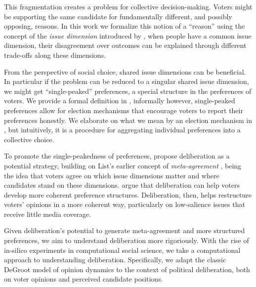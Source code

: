This fragmentation creates a problem for collective decision-making. Voters
might be supporting the same candidate for fundamentally different, and
possibly opposing, reasons. In this work we formalize this notion of a ``reason''
using the concept of the \textit{issue dimension} introduced by
\citet{listTwoConceptsAgreement2002}, when people have a common issue
dimension, their disagreement over outcomes can be explained
through different trade-offs along these dimensions.

From the perspective of social choice, shared issue dimensions can be
beneficial. In particular if the problem can be reduced to a singular shared
issue dimension,  we might get ``single-peaked'' preferences, a special
structure in the preferences of voters.  We provide a formal definition in
, informally however, single-peaked preferences allow for
election mechanisms that encourage voters to report their preferences honestly.
We elaborate on what we mean by an election mechanism in , but intuitively, it is a procedure for aggregating individual
preferences into a collective choice.

To promote the single-peakedness of preferences,
\citet{listDeliberationSinglePeakednessPossibility2013} propose deliberation as
a potential strategy, building on List's earlier concept of
\emph{meta-agreement} \cite{listTwoConceptsAgreement2002}, being the idea that
voters agree on which issue dimensions matter and where candidates stand
on these dimensions. \citet{listDeliberationSinglePeakednessPossibility2013} argue that deliberation can help voters
develop more coherent preference structures. Deliberation, then, helps
restructure voters' opinions in a more coherent way, particularly on
low-salience issues that receive little media coverage.

Given deliberation's potential to generate meta-agreement and more structured
preferences, we aim to understand deliberation more rigoriously.  With the rise
of in-silico experiments in computational social science, we take a
computational approach to understanding deliberation. Specifically, we adapt
the classic DeGroot model of opinion dynamics
\cite{degrootReachingConsensus1974} to the context of political deliberation,
both on voter opinions and perceived candidate positions.

